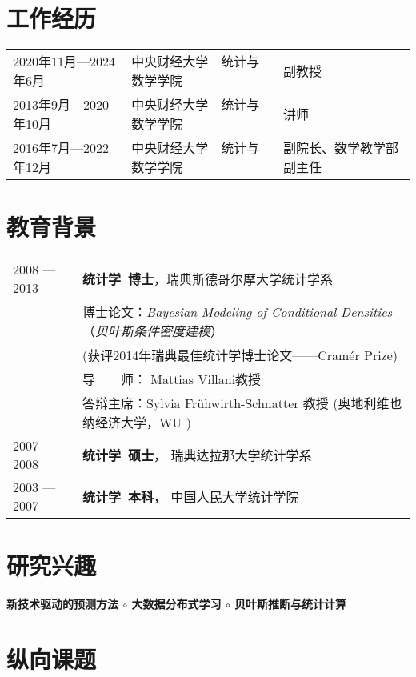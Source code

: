 \documentclass[twoside,a4paper,11pt]{article}
\begin{document}
\section{工作经历}

\begin{tabular}{lll}
2020年11月—2024年6月 & 中央财经大学　统计与数学学院 & 副教授 \\
2013年9月—2020年10月 & 中央财经大学　统计与数学学院 & 讲师    \\
2016年7月—2022年12月 & 中央财经大学　统计与数学学院 & 副院长、数学教学部副主任
\end{tabular}

\section{教育背景}

\begin{tabular}{ l  p{}}
  2008 --- 2013 & \textbf{统计学~博士}，瑞典斯德哥尔摩大学统计学系 \\
                & 博士论文：\emph{Bayesian Modeling of Conditional Densities}（\emph{贝叶斯条件密度建模}） \\
                & (获评2014年瑞典最佳统计学博士论文——Cramér Prize) \\
                & 导　　师： Mattias Villani教授        \\
                & 答辩主席：Sylvia Frühwirth-Schnatter 教授 (奥地利维也纳经济大学，WU ) \\
  2007 --- 2008 & \textbf{统计学~硕士}， 瑞典达拉那大学统计学系 \\
  2003 --- 2007 & \textbf{统计学~本科}， 中国人民大学统计学院    \\
\end{tabular}

\section{研究兴趣}

\textbf{新技术驱动的预测方法 $\circ$  大数据分布式学习 $\circ$ 贝叶斯推断与统计计算}

\section{纵向课题}
\end{document}

